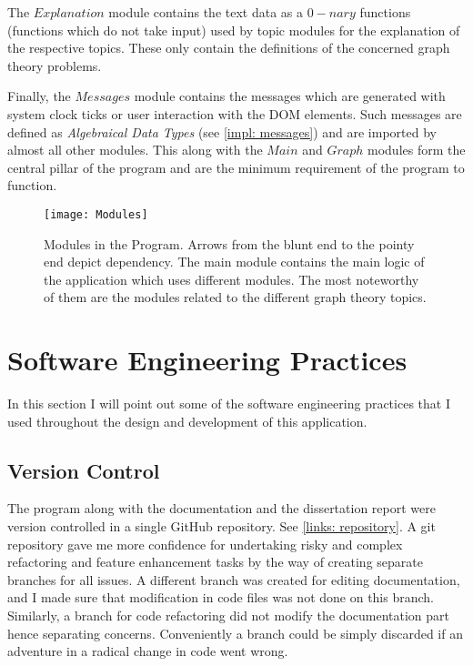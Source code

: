 The $Explanation$ module contains the text data as a $0-nary$ functions
(functions which do not take input) used by topic modules for the explanation of
the respective topics. These only contain the definitions of the concerned
graph theory problems.

Finally, the $Messages$ module contains the messages which are generated with system
clock ticks or user interaction with the DOM elements.  Such messages are
defined as \emph{Algebraical Data Types} (see \autoref{impl: messages}) and are
imported by almost all other modules. This along with the $Main$ and $Graph$
modules form the central pillar of the program and are the minimum requirement
of the program to function.

\begin{figure}[h]
\centering
\texttt{[image: Modules]}
\caption{
        Modules in the Program. Arrows from the blunt end to the pointy end
        depict dependency. The main module contains the main logic of the application which
        uses different modules.  The most noteworthy of them are the modules
        related to the different graph theory topics.
        }
\end{figure}

\section{Software Engineering Practices}
In this section I will point out some of the software engineering practices that I used throughout the design and development of this application.

\subsection{Version Control}
The program along with the documentation and the dissertation report were
version controlled in a single GitHub repository. See \autoref{links:
repository}. A git repository gave me more confidence for undertaking risky and complex
refactoring and feature enhancement tasks by the way of creating separate branches
for all issues. A different branch was created for editing
documentation, and I made sure that modification in code files was not
done on this branch. Similarly, a branch for code refactoring did not modify the
documentation part hence separating concerns. Conveniently a branch could be
simply discarded if an adventure in a radical change in code went wrong.

